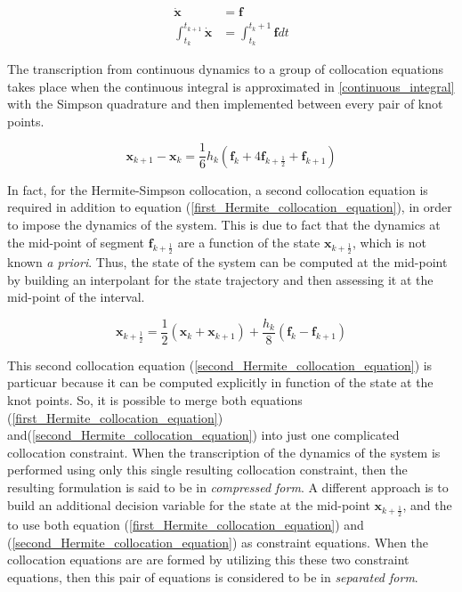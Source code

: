 \documentclass{thesisreport}
\begin{document}
  
  \begin{align}
  	\dot{\bm{x}} &= \bm{f} \\
  	\int_{t_k}^{t_{k+1}} \dot{\bm{x}} &= \int_{t_k}^{t_k+1} \bm{f} dt  	\label{continuous_integral}
  \end{align}
  
  The transcription from continuous dynamics to a group of collocation equations takes place when the continuous integral is approximated in  \ref{continuous_integral} with the Simpson quadrature and then implemented between every pair of knot points. 
  
  \begin{equation}\label{first_Hermite_collocation_equation}
  	\bm{x}_{k+1} - \bm{x}_k = \frac{1}{6} h_k(\bm{f}_k + 4 \bm{f}_{k + \frac{1}{2}} + \bm{f}_{k+1})
  \end{equation}
  	
  In fact, for the Hermite-Simpson collocation, a second collocation equation is required in addition to equation (\ref{first_Hermite_collocation_equation}), in order to impose the dynamics of the system. This is due to fact that the dynamics at the mid-point of segment $\bm{f}_{k+\frac{1}{2}}$ are a function of the state $\bm{x}_{k+\frac{1}{2}}$, which is not known \textit{a priori}. Thus, the state of the system can be computed at the mid-point by building an interpolant for the state trajectory  and then assessing it at the mid-point of the interval.
  

	\begin{equation}\label{second_Hermite_collocation_equation}
	\bm{x}_{k+\frac{1}{2}} = \frac{1}{2}( \bm{x}_k + \bm{x}_{k+1}) + \frac{h_k}{8}(\bm{f}_k - \bm{f}_{k+1})
	\end{equation}
  
  This second collocation equation (\ref{second_Hermite_collocation_equation}) is particuar because it can be computed explicitly in function of the state at the knot points. So, it is possible to merge both equations  (\ref{first_Hermite_collocation_equation}) and(\ref{second_Hermite_collocation_equation})  into just one complicated collocation constraint. When the transcription of the dynamics of the system is performed using only this single resulting collocation constraint, then the resulting formulation is said to be in \textit{compressed form}. A different approach is to build an additional decision variable for the state at the mid-point $\bm{x}_{k+\frac{1}{2}}$, and the to use both equation (\ref{first_Hermite_collocation_equation})
  and (\ref{second_Hermite_collocation_equation})
  as constraint equations. When the collocation equations are are formed by utilizing this these two constraint equations, then this pair of equations is considered to be in \textit{separated form}. 
  
\end{document}
